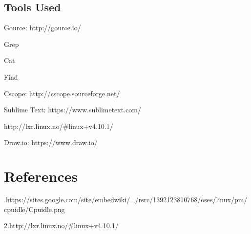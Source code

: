 \documentclass[10pt,preprint]{sigplanconf}
\begin{document}
\subsection{Tools Used}

\quad Gource: http://gource.io/

Grep

Cat

Find

Cscope: http://cscope.sourceforge.net/

Sublime Text: https://www.sublimetext.com/

http://lxr.linux.no/\#linux+v4.10.1/

Draw.io: https://www.draw.io/


\section{References}


.\quad https://sites.google.com/site/embedwiki/\_/rsrc/1392123810768/oses/linux/pm/cpuidle/Cpuidle.png

2.\quad http://lxr.linux.no/\#linux+v4.10.1/


% 
\end{document}
